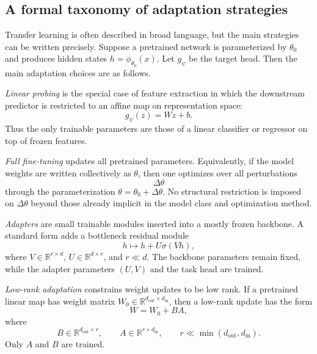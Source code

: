 \subsection*{A formal taxonomy of adaptation strategies}

Transfer learning is often described in broad language, but the main strategies can be written precisely.
Suppose a pretrained network is parameterized by $\theta_0$ and produces hidden states $h = \phi_{\theta_0}(x)$.
Let $g_{\psi}$ be the target head.
Then the main adaptation choices are as follows.

\begin{definition}
\emph{Linear probing} is the special case of feature extraction in which the downstream predictor is restricted to an affine map on representation space:
\[
g_{\psi}(z) = Wz + b.
\]
Thus the only trainable parameters are those of a linear classifier or regressor on top of frozen features.
\end{definition}

\begin{definition}
\emph{Full fine-tuning} updates all pretrained parameters.
Equivalently, if the model weights are written collectively as $\theta$, then one optimizes over all perturbations
\[
\Delta \theta
\]
through the parameterization $\theta = \theta_0 + \Delta \theta$.
No structural restriction is imposed on $\Delta \theta$ beyond those already implicit in the model class and optimization method.
\end{definition}

\begin{definition}
\emph{Adapters} are small trainable modules inserted into a mostly frozen backbone.
A standard form adds a bottleneck residual module
\[
h \mapsto h + U\sigma(Vh),
\]
where $V \in \mathbb{R}^{r \times d}$, $U \in \mathbb{R}^{d \times r}$, and $r \ll d$.
The backbone parameters remain fixed, while the adapter parameters $(U,V)$ and the task head are trained.
\end{definition}

\begin{definition}
\emph{Low-rank adaptation} constrains weight updates to be low rank.
If a pretrained linear map has weight matrix $W_0 \in \mathbb{R}^{d_{\mathrm{out}} \times d_{\mathrm{in}}}$, then a low-rank update has the form
\[
W = W_0 + BA,
\]
where
\[
B \in \mathbb{R}^{d_{\mathrm{out}} \times r},
\qquad
A \in \mathbb{R}^{r \times d_{\mathrm{in}}},
\qquad
r \ll \min(d_{\mathrm{out}},d_{\mathrm{in}}).
\]
Only $A$ and $B$ are trained.
\end{definition}

